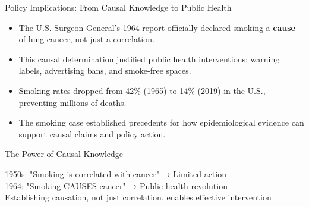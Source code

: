 \documentclass{beamer}
\begin{document}
	\begin{frame}{Policy Implications: From Causal Knowledge to Public Health}
		\begin{itemize}
			\item The U.S. Surgeon General's 1964 report officially declared smoking a \textbf{cause} of lung cancer, not just a correlation.
			\item This causal determination justified public health interventions: warning labels, advertising bans, and smoke-free spaces.
			\item Smoking rates dropped from 42\% (1965) to 14\% (2019) in the U.S., preventing millions of deaths.
			\item The smoking case established precedents for how epidemiological evidence can support causal claims and policy action.
		\end{itemize}
		
		\begin{alertblock}{The Power of Causal Knowledge}
			\begin{center}
				1950s: "Smoking is correlated with cancer" → Limited action\\
				1964: "Smoking CAUSES cancer" → Public health revolution\\
				\vspace{0.2cm}
				Establishing causation, not just correlation, enables effective intervention
			\end{center}
		\end{alertblock}
	\end{frame}
\end{document}
